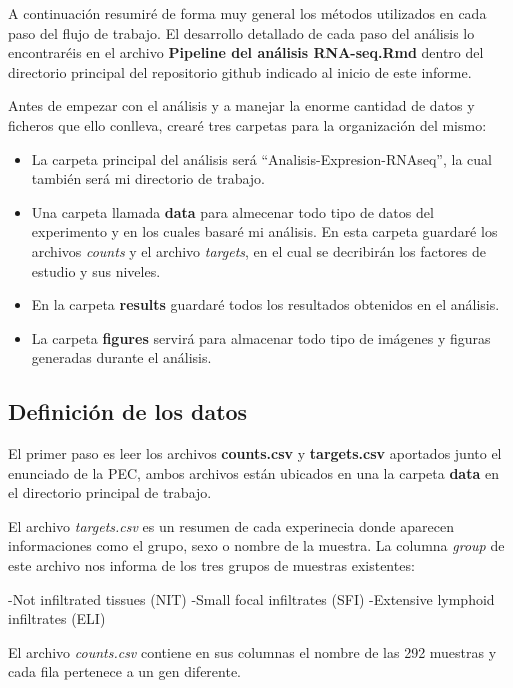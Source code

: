 \documentclass[]{article}
\providecommand{\tightlist}{%
  \setlength{\itemsep}{0pt}\setlength{\parskip}{0pt}}
\begin{document}
A continuación resumiré de forma muy general los métodos utilizados en
cada paso del flujo de trabajo. El desarrollo detallado de cada paso del
análisis lo encontraréis en el archivo \textbf{Pipeline del análisis
RNA-seq.Rmd} dentro del directorio principal del repositorio github
indicado al inicio de este informe.

Antes de empezar con el análisis y a manejar la enorme cantidad de datos
y ficheros que ello conlleva, crearé tres carpetas para la organización
del mismo:

\begin{itemize}
\tightlist
\item
  La carpeta principal del análisis será ``Analisis-Expresion-RNAseq'',
  la cual también será mi directorio de trabajo.
\item
  Una carpeta llamada \textbf{data} para almecenar todo tipo de datos
  del experimento y en los cuales basaré mi análisis. En esta carpeta
  guardaré los archivos \emph{counts} y el archivo \emph{targets}, en el
  cual se decribirán los factores de estudio y sus niveles.
\item
  En la carpeta \textbf{results} guardaré todos los resultados obtenidos
  en el análisis.
\item
  La carpeta \textbf{figures} servirá para almacenar todo tipo de
  imágenes y figuras generadas durante el análisis.
\end{itemize}

\hypertarget{definiciuxf3n-de-los-datos}{%
\subsection{Definición de los datos}\label{definiciuxf3n-de-los-datos}}

El primer paso es leer los archivos \textbf{counts.csv} y
\textbf{targets.csv} aportados junto el enunciado de la PEC, ambos
archivos están ubicados en una la carpeta \textbf{data} en el directorio
principal de trabajo.

El archivo \emph{targets.csv} es un resumen de cada experinecia donde
aparecen informaciones como el grupo, sexo o nombre de la muestra. La
columna \emph{group} de este archivo nos informa de los tres grupos de
muestras existentes:

-Not infiltrated tissues (NIT) -Small focal infiltrates (SFI) -Extensive
lymphoid infiltrates (ELI)

El archivo \emph{counts.csv} contiene en sus columnas el nombre de las
292 muestras y cada fila pertenece a un gen diferente.
\end{document}
